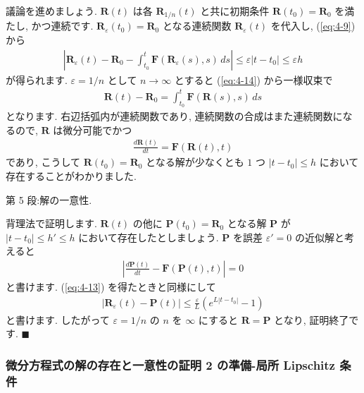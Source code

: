 \documentclass[openany, a4paper, oneside]{jsbook}
\theoremstyle{break}
\theoremstyle{breakdefn}
\newcommand{\abs}[1]{\left|#1\right|}
\newcommand{\vep}{\varepsilon}
\begin{document}
議論を進めましょう.
$\bm{R}(t)$ は各 $\bm{R}_{1/n}(t)$ と共に初期条件 $\bm{R}(t_0)=\bm{R}_0$ を満たし, かつ連続です.
$\bm{R}_{\vep}(t_0)=\bm{R}_0$ となる連続関数 $\bm{R}_{\vep}(t)$ を代入し, (\ref{eq:4-9}) から
\begin{gather}
\left| \bm{R}_{\vep}(t) - \bm{R}_0 - \int_{t_0}^t \bm{F} (\bm{R}_{\vep} (s) , s ) \, ds \right|
\leq
\vep | t - t_0 |
\leq
\vep h
\end{gather}
が得られます.
$\vep = 1/n$ として $n\to \infty$ とすると (\ref{eq:4-14}) から一様収束で
\begin{gather}
\bm{R}(t) - \bm{R}_0
=
\int_{t_0}^t \bm{F} ( \bm{R}(s) , s ) \, ds
\end{gather}
となります.
右辺括弧内が連続関数であり, 連続関数の合成はまた連続関数になるので,
$\bm{R}$ は微分可能でかつ
\begin{gather}
\frac{d \bm{R} (t)} {dt}
=
\bm{F} ( \bm{R}(t) , t )
\end{gather}
であり, こうして $\bm{R}(t_0) = \bm{R}_0$ となる解が少なくとも $1$ つ $| t - t_0 |\leq h$ において
存在することがわかりました.

第 5 段:解の一意性.

背理法で証明します.
$\bm{R}(t)$ の他に $\bm{P}(t_0) = \bm{R}_0$ となる解 $\bm{P}$ が
$|t-t_0| \leq h' \leq h$ において存在したとしましょう.
$\bm{P}$ を誤差 $\vep '=0$ の近似解と考えると
\begin{gather}
\left| \frac{d \bm{P} (t)} {dt} - \bm{F} ( \bm{P}(t) , t ) \right|
=
0
\end{gather}
と書けます.
(\ref{eq:4-13}) を得たときと同様にして
\begin{gather}
\abs{\bm{R}_{\vep} (t) - \bm{P}(t)}
\leq
\frac{\vep} {L} \left ( e^{L | t - t_0 |} - 1 \right)
\end{gather}
と書けます.
したがって $\vep = 1/n$ の $n$ を $\infty$ にすると $\bm{R}=\bm{P}$
となり, 証明終了です.  $\blacksquare$
\subsubsection{微分方程式の解の存在と一意性の証明 2 の準備-局所 Lipschitz 条件}
\end{document}
